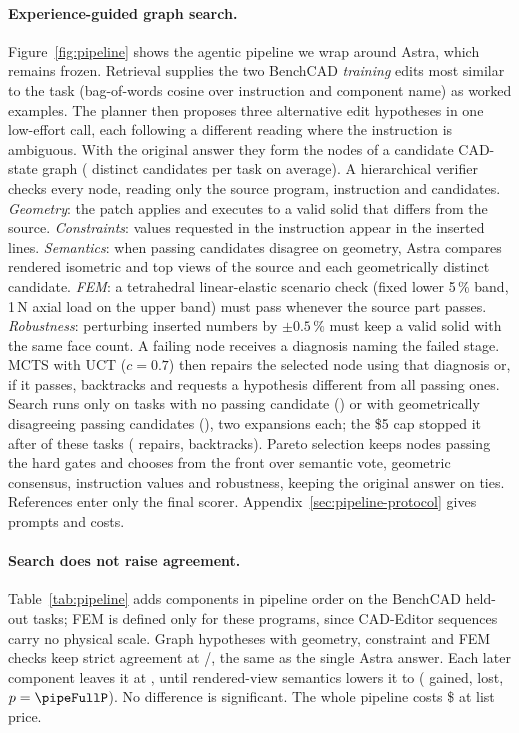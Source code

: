 \paragraph{Experience-guided graph search.}
Figure~\ref{fig:pipeline} shows the agentic pipeline we wrap around Astra, which remains frozen. Retrieval supplies the two BenchCAD \emph{training} edits most similar to the task (bag-of-words cosine over instruction and component name) as worked examples. The planner then proposes three alternative edit hypotheses in one low-effort call, each following a different reading where the instruction is ambiguous. With the original answer they form the nodes of a candidate CAD-state graph (\pipeCandidates{} distinct candidates per task on average). A hierarchical verifier checks every node, reading only the source program, instruction and candidates. \emph{Geometry}: the patch applies and executes to a valid solid that differs from the source. \emph{Constraints}: values requested in the instruction appear in the inserted lines. \emph{Semantics}: when passing candidates disagree on geometry, Astra compares rendered isometric and top views of the source and each geometrically distinct candidate. \emph{FEM}: a tetrahedral linear-elastic scenario check (fixed lower 5\,\% band, 1\,N axial load on the upper band) must pass whenever the source part passes. \emph{Robustness}: perturbing inserted numbers by $\pm0.5\,\%$ must keep a valid solid with the same face count. A failing node receives a diagnosis naming the failed stage. MCTS with UCT ($c=0.7$) then repairs the selected node using that diagnosis or, if it passes, backtracks and requests a hypothesis different from all passing ones. Search runs only on tasks with no passing candidate (\pipeNoPass) or with geometrically disagreeing passing candidates (\pipeDisagree), two expansions each; the \$5 cap stopped it after \pipeExpanded{} of these \pipeEligible{} tasks (\pipeRepairs{} repairs, \pipeBacktracks{} backtracks). Pareto selection keeps nodes passing the hard gates and chooses from the front over semantic vote, geometric consensus, instruction values and robustness, keeping the original answer on ties. References enter only the final scorer. Appendix~\ref{sec:pipeline-protocol} gives prompts and costs.

\paragraph{Search does not raise agreement.}
Table~\ref{tab:pipeline} adds components in pipeline order on the \pipeN{} BenchCAD held-out tasks; FEM is defined only for these programs, since CAD-Editor sequences carry no physical scale. Graph hypotheses with geometry, constraint and FEM checks keep strict agreement at \pipeGot/\pipeN{}, the same as the single Astra answer. Each later component leaves it at \pipeMcts{}, until rendered-view semantics lowers it to \pipeFull{} (\pipeFullGain{} gained, \pipeFullLoss{} lost, $p=\pipeFullP$). No difference is significant. The whole pipeline costs \$\pipeCost{} at list price.

